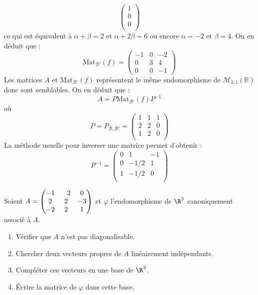 \documentclass[a4paper,10pt]{report}
\begin{document}
\begin{enumerate}
$$\begin{pmatrix}
1 \\
0 \\
0 \\
\end{pmatrix}$$
ce qui est équivalent à $\alpha+ \beta =2$ et $\alpha+2 \beta =6$ ou encore $\alpha=-2$ et $\beta =4$. On en déduit que :
$$ \textrm{Mat}_{\mathcal{B}'}(f) = \begin{pmatrix}
-1 & 0 & -2 \\
0 & 3 & 4 \\
0 & 0 & -1
\end{pmatrix}$$
Les matrices $A$ et $\textrm{Mat}_{\mathcal{B}'}(f)$ représentent le même endomorphisme de $\mathcal{M}_{3,1}(\mathbb{R})$ donc sont semblables. On en déduit que :
$$ A = P \textrm{Mat}_{\mathcal{B}'}(f) P^{-1}$$
où 
$$P=P_{\mathcal{B}, \mathcal{B}'} = \begin{pmatrix}
1 & 1 & 1 \\
2 & 2 & 0 \\
1 & 2 & 0 \\
\end{pmatrix}$$
La méthode usuelle pour inverser une matrice permet d'obtenir :
$$ P^{-1} = \begin{pmatrix}
0 & 1 & -1 \\
0 & -1/2 & 1 \\
1 & -1/2 & 0 \\
\end{pmatrix}$$

\end{enumerate}

\begin{Exercice}{} Soient $A = \begin{pmatrix} -1 &\phantom-2 & 0 \cr 2 &2 &-3 \cr -2 &2 &1 \cr \end{pmatrix}$ et $\varphi$ l'endomorphisme de $\R^3$ canoniquement associé à $A$.

\begin{enumerate}
  \item Vérifier que $A$ n'est pas diagonalisable.
    
  \item Chercher deux vecteurs propres de $A$ linéairement indépendants.
    
  \item Compléter ces vecteurs en une base de $\R^3$.
    
  \item \'Ecrire la matrice de $\varphi$ dans cette base.
        
\end{enumerate}
\end{Exercice} 
\end{document}
